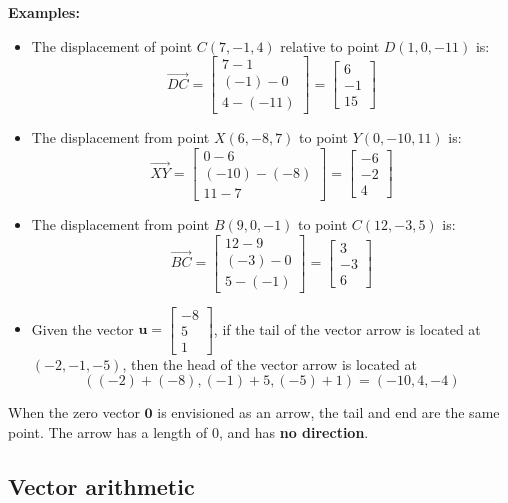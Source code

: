 \documentclass{article}
\begin{document}
\textbf{Examples:}
\begin{itemize}
\item The displacement of point \(C(7, -1, 4)\) relative to point \(D(1, 0, -11)\) is:
\[\overrightarrow{DC} = \begin{bmatrix} 7 - 1 \\ (-1) - 0 \\ 4 - (-11) \end{bmatrix} = \begin{bmatrix} 6 \\ -1 \\ 15 \end{bmatrix}\]
\item The displacement from point \(X(6, -8, 7)\) to point \(Y(0, -10, 11)\) is:
\[\overrightarrow{XY} = \begin{bmatrix} 0 - 6 \\ (-10) - (-8) \\ 11 - 7 \end{bmatrix} = \begin{bmatrix} -6 \\ -2 \\ 4 \end{bmatrix}\]
\item The displacement from point \(B(9, 0, -1)\) to point \(C(12, -3, 5)\) is:
\[\overrightarrow{BC} = \begin{bmatrix} 12 - 9 \\ (-3) - 0 \\ 5 - (-1) \end{bmatrix} = \begin{bmatrix} 3 \\ -3 \\ 6 \end{bmatrix}\]
\item Given the vector \(\mathbf{u} = \begin{bmatrix} -8 \\ 5 \\ 1 \end{bmatrix}\), if the tail of the vector arrow is located at \((-2, -1, -5)\), then the head of the vector arrow is located at 
\[((-2)+(-8), (-1)+5, (-5)+1) = (-10, 4, -4)\]  
\end{itemize}

When the zero vector \(\mathbf{0}\) is envisioned as an arrow, the tail and end are the same point. The arrow has a length of \(0\), and has {\bf no direction}. 


\subsection*{Vector arithmetic}
\end{document}

